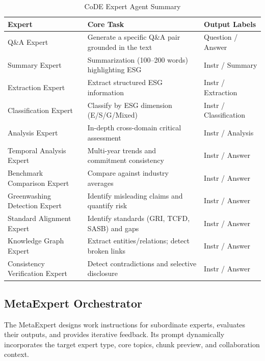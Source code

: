 \documentclass[sigconf,nonacm]{acmart}
\begin{document}
\begin{table}[h]
\centering
\caption{CoDE Expert Agent Summary}
\label{tab:experts}
\small
\begin{tabular}{@{}p{3cm}p{5.5cm}p{2.2cm}@{}}
\toprule
\textbf{Expert} & \textbf{Core Task} & \textbf{Output Labels} \\
\midrule
Q\&A Expert & Generate a specific Q\&A pair grounded in the text & Question / Answer \\
Summary Expert & Summarization (100--200 words) highlighting ESG & Instr / Summary \\
Extraction Expert & Extract structured ESG information & Instr / Extraction \\
Classification Expert & Classify by ESG dimension (E/S/G/Mixed) & Instr / Classification \\
Analysis Expert & In-depth cross-domain critical assessment & Instr / Analysis \\
Temporal Analysis Expert & Multi-year trends and commitment consistency & Instr / Answer \\
Benchmark Comparison Expert & Compare against industry averages & Instr / Answer \\
Greenwashing Detection Expert & Identify misleading claims and quantify risk & Instr / Answer \\
Standard Alignment Expert & Identify standards (GRI, TCFD, SASB) and gaps & Instr / Answer \\
Knowledge Graph Expert & Extract entities/relations; detect broken links & Instr / Answer \\
Consistency Verification Expert & Detect contradictions and selective disclosure & Instr / Answer \\
\bottomrule
\end{tabular}
\end{table}

\subsection{MetaExpert Orchestrator}

The MetaExpert designs work instructions for subordinate experts, evaluates their outputs, and provides iterative feedback. Its prompt dynamically incorporates the target expert type, core topics, chunk preview, and collaboration context.
\end{document}
